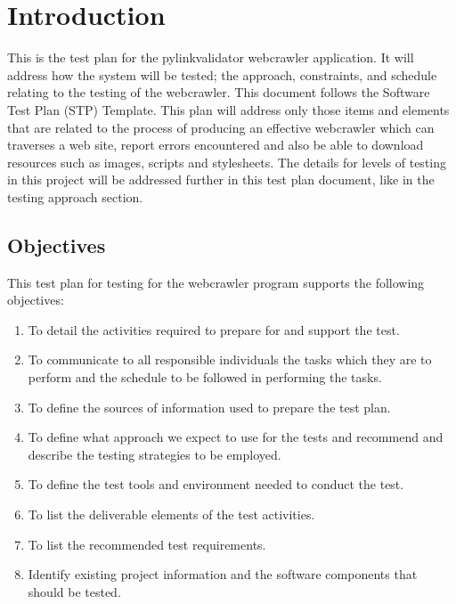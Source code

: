 \documentclass[12pt]{article}
\begin{document}
\section{Introduction}
This is the test plan for the pylinkvalidator webcrawler application.  It will address how the system will be tested; the approach, constraints, and schedule relating to the testing of the webcrawler. This document follows the Software Test Plan (STP) Template.
This plan will address only those items and elements that are related to the process of producing an effective webcrawler which can traverses a web site, report errors encountered and also be able to download resources such as images, scripts and stylesheets. The details for levels of testing in this project will be addressed further in this test plan document, like in the testing approach section.

	


\subsection{Objectives}
This test plan for testing for the webcrawler program supports the following objectives:

\begin{enumerate}

\item To detail the activities required to prepare for and support the test.
 
\item To communicate to all responsible individuals the tasks which they are to perform and the schedule to be followed in performing the tasks.

\item To define the sources of information used to prepare the test plan.

\item To define what approach we expect to use for the tests and recommend and describe the testing strategies to be employed.
 
\item To define the test tools and environment needed to conduct the test.

\item To list the deliverable elements of the test activities.

\item  To list the recommended test requirements.

\item  Identify existing project information and the software components that should be tested.

\end{enumerate}
\end{document}
